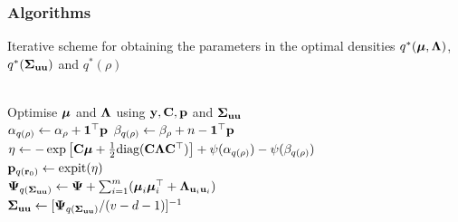 \documentclass{beamer}
\begin{document}

\begin{frame}
	\frametitle{Algorithms}
	
	\begin{algorithm}[H]
		\caption[Algorithm 1]{Iterative scheme for obtaining the parameters in the
			optimal densities $q^*({\boldsymbol \mu}, {\boldsymbol \Lambda})$, $q^*({\boldsymbol \Sigma}_{{\bf u} {\bf u}})$ and $q^*(\rho)$}
		\label{alg:algorithm_one}
		\begin{algorithmic}
			 \\[1ex]
			\STATE Optimise ${\boldsymbol \mu}$ and ${\boldsymbol \Lambda}$ using ${\bf y}, {\bf C}, {\bf p}$ and ${\boldsymbol \Sigma}_{{\bf u} {\bf u}}$ \\[1ex]
			\STATE $\alpha_{q(\rho)} \leftarrow \alpha_\rho + {\bf 1}^\top{\bf p}$
			\STATE $\beta_{q(\rho)} \leftarrow \beta_\rho + n - {\bf 1}^\top{\bf p}$ \\[1ex]
			\STATE $\eta \leftarrow -\exp \left [ {\bf C} {\boldsymbol \mu} + \tfrac{1}{2} \text{diag}{({\bf C}{\boldsymbol\Lambda}{\bf C}^\top)} \right ] + \psi{(\alpha_{q{(\rho)}})} - \psi{(\beta_{q{(\rho)}})}$ \\[1ex]
				\STATE ${\bf p}_{q({\bf r}_0)} \leftarrow \text{expit} (\eta)$ \\[1ex]
				\STATE ${\boldsymbol \Psi}_{q({\boldsymbol \Sigma}_{{\bf u} {\bf u}})} \leftarrow {\boldsymbol\Psi} + \sum_{i=1}^m ({\boldsymbol \mu}_i {\boldsymbol \mu}_i^\top + {\boldsymbol \Lambda}_{{\bf u}_i {\bf u}_i})$ \\[1ex]
				\STATE ${\boldsymbol \Sigma}_{{\bf u}{\bf u}} \leftarrow [{\boldsymbol \Psi}_{q({\boldsymbol \Sigma}_{{\bf u} {\bf u}})}/(v - d - 1)]^{-1}$
				\ENDWHILE
			\end{algorithmic}
		\end{algorithm}
				
	\end{frame}
		
\end{document}
